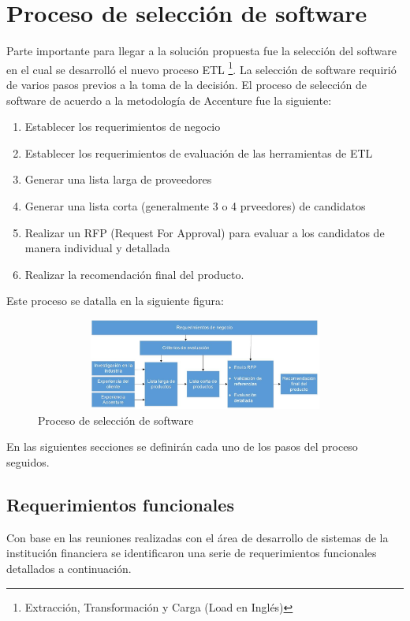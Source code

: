 \documentclass[a4paper,openright,12pt]{book}
\begin{document}
\section{Proceso de selección de software}
Parte importante para llegar a la solución propuesta fue la selección del software en el cual se desarrolló el nuevo proceso ETL \footnote{Extracción, Transformación y Carga (Load en Inglés)}. La selección de software requirió de varios pasos previos a la toma de la decisión. El proceso de selección de software de acuerdo a la metodología de Accenture fue la siguiente:


\begin{enumerate}
\item Establecer los requerimientos de negocio
\item Establecer los requerimientos de evaluación de las herramientas de ETL
\item Generar una lista larga de proveedores
\item Generar una lista corta (generalmente 3 o 4 prveedores) de candidatos
\item Realizar un RFP (Request For Approval) para evaluar a los candidatos de manera individual y detallada
\item Realizar la recomendación final del producto. 
\end{enumerate}

Este proceso se datalla en la siguiente figura:
\begin{figure}[htb]
  \begin{center}
    \includegraphics[width=12cm, height=3cm, scale=0.5]{Proceso_seleccion_software.jpg}
        \caption{Proceso de selección de software}
    \label{fig:proceso}
  \end{center}
\end{figure}

En las siguientes secciones se definirán cada uno de los pasos del proceso seguidos.

\subsection{Requerimientos funcionales}

Con base en las reuniones realizadas con el área de desarrollo de sistemas de la institución financiera se identificaron una serie de requerimientos funcionales detallados a continuación. 
\end{document}
